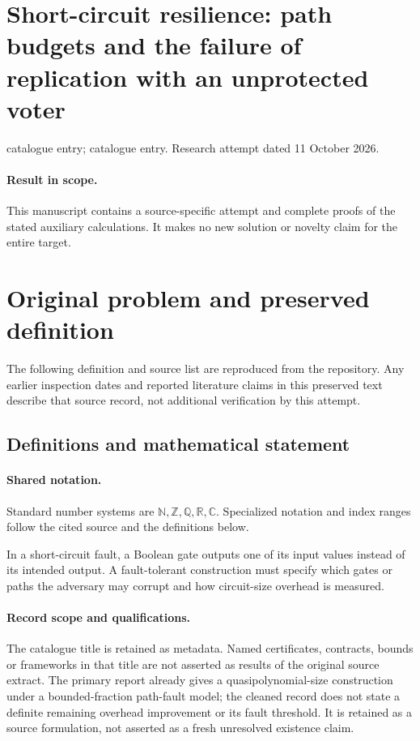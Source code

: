 \documentclass[11pt]{article}
\begin{document}
\section*{Short-circuit resilience: path budgets and the failure of replication with an unprotected voter}
\noindent catalogue entry; catalogue entry. Research attempt dated 11 October 2026.
\paragraph{Result in scope.}This manuscript contains a source-specific attempt and complete proofs of the stated auxiliary calculations. It makes no new solution or novelty claim for the entire target.
\section{Original problem and preserved definition}
The following definition and source list are reproduced from the repository. Any earlier inspection dates and reported literature claims in this preserved text describe that source record, not additional verification by this attempt.
\subsection{Definitions and mathematical statement}

\paragraph{Shared notation.}Standard number systems are $\mathbb N,\mathbb Z,\mathbb Q,\mathbb R,\mathbb C$. Specialized notation and index ranges follow the cited source and the definitions below.


In a short-circuit fault, a Boolean gate outputs one of its input values instead of its intended output. A fault-tolerant construction must specify which gates or paths the adversary may corrupt and how circuit-size overhead is measured.
\paragraph{Record scope and qualifications.}
The catalogue title is retained as metadata. Named certificates, contracts, bounds or frameworks in that title are not asserted as results of the original source extract.
The primary report already gives a quasipolynomial-size construction under a bounded-fraction path-fault model; the cleaned record does not state a definite remaining overhead improvement or its fault threshold. It is retained as a source formulation, not asserted as a fresh unresolved existence claim.
\end{document}
